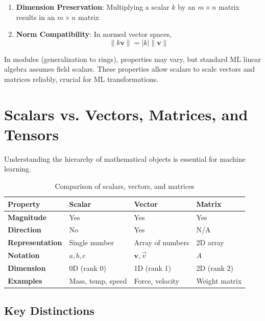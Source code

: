 \documentclass[11pt,a4paper]{article}
\begin{document}
\begin{enumerate}
    \item \textbf{Dimension Preservation}: Multiplying a scalar $k$ by an $m \times n$ matrix results in an $m \times n$ matrix
    
    \item \textbf{Norm Compatibility}: In normed vector spaces,
    \begin{equation}
        \|k \mathbf{v}\| = |k| \|\mathbf{v}\|
    \end{equation}
\end{enumerate}

In modules (generalization to rings), properties may vary, but standard ML linear algebra assumes field scalars. These properties allow scalars to scale vectors and matrices reliably, crucial for ML transformations.

\section{Scalars vs. Vectors, Matrices, and Tensors}

Understanding the hierarchy of mathematical objects is essential for machine learning.

\begin{table}[h]
\centering
\begin{tabular}{|l|l|l|l|}
\hline
\textbf{Property} & \textbf{Scalar} & \textbf{Vector} & \textbf{Matrix} \\ \hline
\textbf{Magnitude} & Yes & Yes & Yes \\ \hline
\textbf{Direction} & No & Yes & N/A \\ \hline
\textbf{Representation} & Single number & Array of numbers & 2D array \\ \hline
\textbf{Notation} & $a, b, c$ & $\mathbf{v}, \vec{v}$ & $A$ \\ \hline
\textbf{Dimension} & 0D (rank 0) & 1D (rank 1) & 2D (rank 2) \\ \hline
\textbf{Examples} & Mass, temp, speed & Force, velocity & Weight matrix \\ \hline
\end{tabular}
\caption{Comparison of scalars, vectors, and matrices}
\end{table}

\subsection{Key Distinctions}
\end{document}
